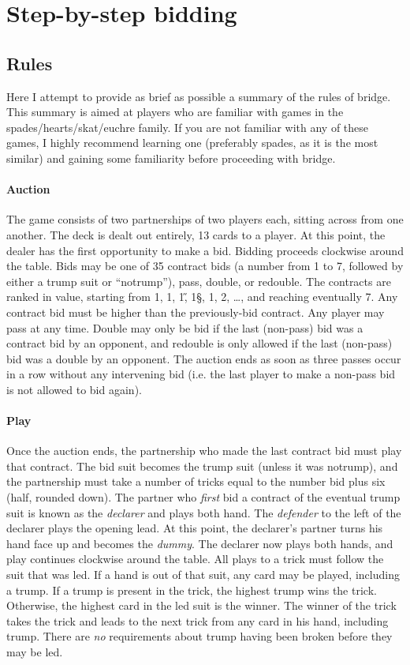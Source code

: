 \documentclass[oneside]{memoir}
\begin{document}
\part{Step-by-step bidding}
\chapter{Rules}
Here I attempt to provide as brief as possible a summary of the rules of
bridge.  This summary is aimed at players who are familiar with games
in the spades/hearts/skat/euchre family.  If you are not familiar with any
of these games, I highly recommend learning one (preferably spades, as it
is the most similar) and gaining some familiarity before proceeding with
bridge.

\subsection{Auction}
The game consists of two partnerships of two players each, sitting
across from one another.  The deck is dealt out entirely, 13 cards to
a player.  At this point, the dealer has the first opportunity to make
a bid.  Bidding proceeds clockwise around the table.  Bids may be one
of 35 contract bids (a number from 1 to 7, followed by either a trump
suit or ``notrump''), pass, double, or redouble.  The contracts are
ranked in value, starting from 1\C, 1\D, 1\H, 1\S, 1\NT, 2\C, \ldots,
and reaching eventually 7\NT.  Any contract bid must be higher than
the previously-bid contract.  Any player may pass at any time.  Double
may only be bid if the last (non-pass) bid was a contract bid by an
opponent, and redouble is only allowed if the last (non-pass) bid was
a double by an opponent.  The auction ends as soon as three passes
occur in a row without any intervening bid (i.e. the last player to
make a non-pass bid is not allowed to bid again).

\subsection{Play}
Once the auction ends, the partnership who made the last contract bid
must play that contract.  The bid suit becomes the trump suit (unless
it was notrump), and the partnership must take a number of tricks
equal to the number bid plus six (half, rounded down).  The partner
who \textit{first} bid a contract of the eventual trump suit is known
as the \textit{declarer} and plays both hand.  The \textit{defender}
to the left of the declarer plays the opening lead.  At this point,
the declarer's partner turns his hand face up and becomes the
\textit{dummy}.  The declarer now plays both hands, and play continues
clockwise around the table.  All plays to a trick must follow the suit
that was led.  If a hand is out of that suit, any card may be played,
including a trump.  If a trump is present in the trick, the highest
trump wins the trick.  Otherwise, the highest card in the led suit is
the winner.  The winner of the trick takes the trick and leads to the
next trick from any card in his hand, including trump.  There are
\textit{no} requirements about trump having been broken before they
may be led.
\end{document}
